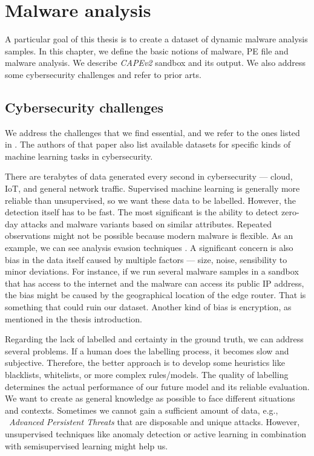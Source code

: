 \chapter{Malware analysis} \label{chap:analysis}
A particular goal of this thesis is to create a dataset of dynamic malware analysis samples. In this chapter, we define the basic notions of malware, PE file and malware analysis. We describe \emph{CAPEv2} sandbox and its output. We also address some cybersecurity challenges and refer to prior arts.

\section{Cybersecurity challenges}
We address the challenges that we find essential, and we refer to the ones listed in \cite{Amit2019}. The authors of that paper also list available datasets for specific kinds of machine learning tasks in cybersecurity.

There are terabytes of data generated every second in cybersecurity --- cloud, IoT, and general network traffic. Supervised machine learning is generally more reliable than unsupervised, so we want these data to be labelled. However, the detection itself has to be fast. The most significant is the ability to detect zero-day attacks and malware variants based on similar attributes. Repeated observations might not be possible because modern malware is flexible. As an example, we can see analysis evasion techniques \cite{Afianian2018}. A significant concern is also bias in the data itself caused by multiple factors --- size, noise, sensibility to minor deviations. For instance, if we run several malware samples in a sandbox that has access to the internet and the malware can access its public IP address, the bias might be caused by the geographical location of the edge router. That is something that could ruin our dataset. Another kind of bias is encryption, as mentioned in the thesis introduction.

Regarding the lack of labelled and certainty in the ground truth, we can address several problems. If a human does the labelling process, it becomes slow and subjective. Therefore, the better approach is to develop some heuristics like blacklists, whitelists, or more complex rules/models. The quality of labelling determines the actual performance of our future model and its reliable evaluation. We want to create as general knowledge as possible to face different situations and contexts. Sometimes we cannot gain a sufficient amount of data, e.g., \  \emph{Advanced Persistent Threats} that are disposable and unique attacks. However, unsupervised techniques like anomaly detection or active learning in combination with semisupervised learning might help us.

